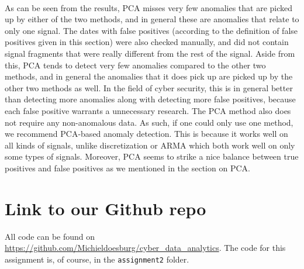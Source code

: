 \documentclass[]{article}
\begin{document}
\\
As can be seen from the results, PCA misses very few anomalies that are picked up by either of the two methods, and in general these are anomalies that relate to only one signal. The dates with false positives (according to the definition of false positives given in this section) were also checked manually, and did not contain signal fragments that were really different from the rest of the signal. Aside from this, PCA tends to detect very few anomalies compared to the other two methods, and in general the anomalies that it does pick up are picked up by the other two methods as well. In the field of cyber security, this is in general better than detecting more anomalies along with detecting more false positives, because each false positive warrants a unnecessary research. The PCA method also does not require any non-anomalous data. As such, if one could only use one method, we recommend PCA-based anomaly detection. This is because it works well on all kinds of signals, unlike discretization or ARMA which both work well on only some types of signals. Moreover, PCA seems to strike a nice balance between true positives and false positives as we mentioned in the section on PCA.

\section{Link to our Github repo}
All code can be found on \url{https://github.com/Michieldoesburg/cyber_data_analytics}. The code for this assignment is, of course, in the \texttt{assignment2} folder.


\end{document}

